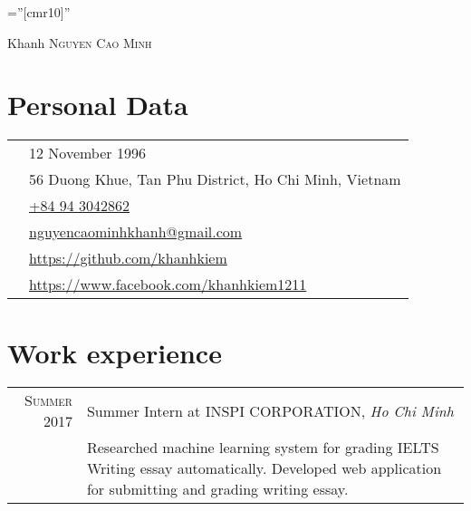 \documentclass[a4paper,10pt]{article}
\begin{document}

\pagestyle{empty} %

\font\fb=''[cmr10]'' %

\par{\centering
	{\Huge Khanh \textsc{Nguyen Cao Minh}
	}\bigskip\par}

\section{Personal Data}

\begin{tabular}{cl}
	\textsc{\faBirthdayCake} & 12 November 1996                                               \\
	\textsc{\faMapMarker}                 & 56 Duong Khue, Tan Phu District, Ho Chi Minh, Vietnam                                 \\
	\textsc{\faMobile}                   & \href{tel:+84943042862}{+84 94 3042862}                                                                        \\
	\textsc{\faEnvelopeO}                   & \href{mailto:nguyencaominhkhanh@gmail.com}{nguyencaominhkhanh@gmail.com}              \\
	\textsc{\faGithub}                  & \href{https://github.com/khanhkiem}{https://github.com/khanhkiem}                     \\
	\textsc{\faFacebookOfficial}                & \href{https://www.facebook.com/khanhkiem1211}{https://www.facebook.com/khanhkiem1211} \\
\end{tabular}

\section{Work experience}
\begin{tabular}{r|p{11cm}}
	\textsc{Summer 2017} & Summer Intern at \textsc{INSPI CORPORATION}, \emph{Ho Chi Minh}\\&\footnotesize{Researched machine learning system for grading IELTS Writing essay automatically. Developed web application for submitting and grading writing essay.}\\
\end{tabular}
\end{document}
